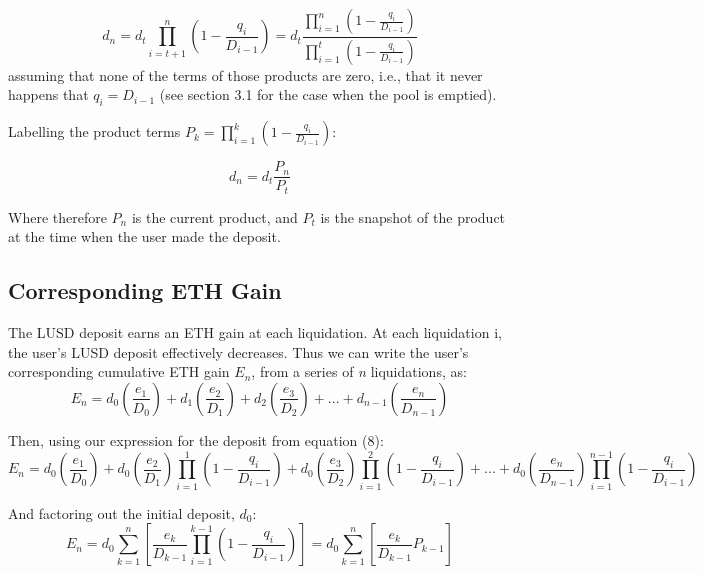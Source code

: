 \documentclass[reqno]{article}
\begin{document}
\begin{equation} 
    d_n=d_t\prod^n_{i=t+1}{\left(1-\frac{q_i}{D_{i-1}}\right)}=d_t\frac{\displaystyle\prod^n_{i=1}{\left(1-\frac{q_i}{D_{i-1}}\right)}}{\displaystyle\prod^t_{i=1}\left(1-\frac{q_i}{D_{i-1}}\right)}
\end{equation}
assuming that none of the terms of those products are zero, i.e., that it never
happens that $q_i = D_{i-1}$ (see section 3.1 for the case when the pool is emptied).

\bigskip
Labelling the product terms $P_k = \displaystyle\prod^k_{i=1}{\left(1-\frac{q_i}{D_{i-1}}\right)}$:

\begin{equation} 
d_n=d_t\frac{P_n}{P_t}
\end{equation}

\bigskip
Where therefore $P_n$ is the current product, and {$P_t$} is the snapshot of the product at the time when the user made the deposit.

\bigskip
\subsection{Corresponding ETH Gain}

\bigskip
The LUSD deposit earns an ETH gain at each liquidation.
At each liquidation i, the user’s LUSD deposit effectively decreases. Thus we can write the
user’s corresponding cumulative ETH gain $E_{n}$, from a series of \textit{n} liquidations, as:
\begin{equation} 
E_n=d_0\left(\frac{e_1}{D_0}\right)+d_1\left(\frac{e_2}{D_1}\right)+d_2\left(\frac{e_3}{D_2}\right)+...+d_{n-1}\left(\frac{e_n}{D_{n-1}}\right)
\end{equation}

\bigskip
Then, using our expression for the deposit from equation (8):
\begin{equation} 
E_n=d_0\left(\frac{e_1}{D_0}\right)+d_0\left(\frac{e_2}{D_1}\right)\prod^1_{i=1}\left(1-\frac{q_i}{D_{i-1}}\right)+d_0\left(\frac{e_3}{D_2}\right)\prod^2_{i=1}\left(1-\frac{q_i}{D_{i-1}}\right)+...+d_0\left(\frac{e_n}{D_{n-1}}\right)\prod^{n-1}_{i=1}\left(1-\frac{q_i}{D_{i-1}}\right)
\end{equation}

\bigskip
And factoring out the initial deposit, $d_0$:
\begin{equation} 
    E_n=d_0\sum^n_{k=1}\left[\frac{e_k}{D_{k-1}}\prod^{k-1}_{i=1}\left(1-\frac{q_i}{D_{i-1}}\right)\right] = d_0\sum^n_{k=1}\left[\frac{e_k}{D_{k-1}}P_{k-1}\right]
\end{equation}
\end{document}

